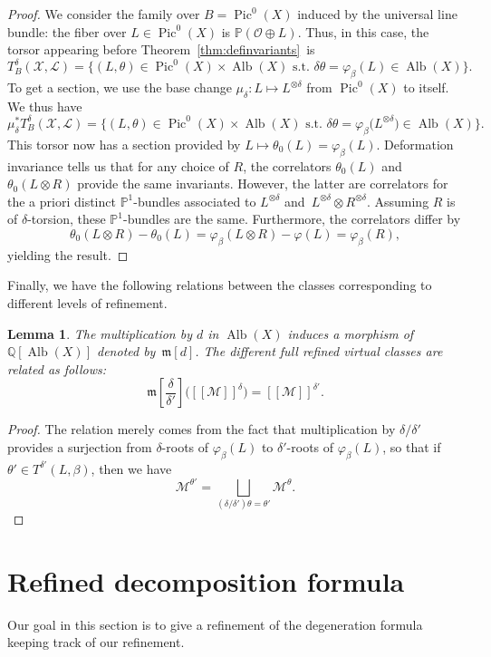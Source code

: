 \documentclass[pdftex]{sigma}
\newcommand{\fvir}[2]{[\![ #1 ]\!]^{#2}}
\newcommand{\m}[1]{\mfk\left[ #1 \right]}
\newcommand{\Pic}{\operatorname{Pic}}
\newcommand{\Alb}{\operatorname{Alb}}
\newcommand{\PP}{\mathbb{P}}
\newcommand{\QQ}{\mathbb{Q}}
\newcommand{\mfk}{\mathfrak{m}}
\renewcommand{\L}{\mathcal{L}}
\newcommand{\M}{\mathcal{M}}
\newcommand{\X}{\mathcal{X}}
\renewcommand{\O}{\mathcal{O}}
\numberwithin{equation}{section}
\newtheorem{lem}[theo]{Lemma}
\theoremstyle{definition}
\begin{document}
\begin{proof}
We consider the family over $B=\Pic^0(X)$ induced by the universal line bundle: the fiber over $L\in\Pic^0(X)$ is $\PP(\O\oplus L)$. Thus, in this case, the torsor appearing before Theorem~\ref{thm:definvariants}~is
\[ T^\delta_B(\X,\L) = \big\{ (L,\theta)\in\Pic^0(X)\times\Alb(X) \text{ s.t. } \delta\theta=\varphi_\beta(L)\in\Alb(X)\big\}.
 \]
To get a section, we use the base change $\mu_\delta\colon L\mapsto L^{\otimes\delta}$ from $\Pic^0(X)$ to itself. We thus have
\[ \mu_\delta^*T^\delta_B(\X,\L) = \big\{ (L,\theta)\in\Pic^0(X)\times\Alb(X) \text{ s.t. } \delta\theta=\varphi_\beta\bigl(L^{\otimes\delta}\bigr)\in\Alb(X)\big\}. \]
This torsor now has a section provided by $L\mapsto\theta_0(L)=\varphi_\beta(L)$.
Deformation invariance tells us that for any choice of $R$, the correlators $\theta_0(L)$ and $\theta_0(L\otimes R)$ provide the same invariants. However, the latter are correlators for the a priori distinct $\PP^1$-bundles associated to $L^{\otimes\delta}$ and~${L^{\otimes\delta}\otimes R^{\otimes\delta}}$. Assuming $R$ is of $\delta$-torsion, these $\PP^1$-bundles are the same. Furthermore, the correlators differ by
\[ \theta_0(L\otimes R)-\theta_0(L) = \varphi_\beta(L\otimes R)-\varphi(L)=\varphi_\beta(R), \]
yielding the result.
\end{proof}

Finally, we have the following relations between the classes corresponding to different levels of refinement.

\begin{lem}\label{lem-unrefinement}
The multiplication by $d$ in $\Alb(X)$ induces a morphism of $\QQ[\Alb(X)]$ denoted by~$\m{d}$. The different full refined virtual classes are related as follows:
\[ \m{\frac{\delta}{\delta'}}\bigl(\fvir{\M}{\delta}\bigr) = \fvir{\M}{\delta'}. \]
\end{lem}

\begin{proof}
 The relation merely comes from the fact that multiplication by $\delta/\delta'$ provides a surjection from $\delta$-roots of $\varphi_\beta(L)$ to $\delta'$-roots of $\varphi_\beta(L)$, so that if $\theta'\in T^{\delta'}(L,\beta)$, then we have
 \[ \M^{\theta'}=\bigsqcup_{(\delta/\delta')\theta=\theta'}\M^{\theta}. \tag*{\qed}
 \]\renewcommand{\qed}{}
\end{proof}

\section{Refined decomposition formula}
Our goal in this section is to give a refinement of the degeneration formula \cite{chen2013degeneration,li2002degeneration} keeping track of our refinement.
\end{document}
